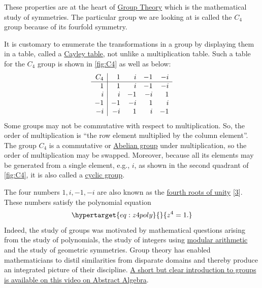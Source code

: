 \documentclass[
  a4paper,
]{article}
\begin{document}
These properties are at the heart of
\href{https://en.wikipedia.org/wiki/Group_(mathematics)}{Group Theory}
which is the mathematical study of symmetries. The particular group we
are looking at is called the \(C_4\) group because of its fourfold
symmetry.

It is customary to enumerate the transformations in a group by
displaying them in a table, called a
\href{https://en.wikipedia.org/wiki/Cayley_table}{Cayley table}, not
unlike a multiplication table. Such a table for the \(C_4\) group is
shown in \cref{fig:C4} as well as below: \[
\begin{array}{r | r  r  r  r}
C_{4} & 1  & i & -1 & -i\\
\hline
1 & 1 & i & -1 & -i\\
i & i & -1 & -i  & 1\\
-1 & -1 & -i & 1 & i\\
-i & -i & 1  & i & -1\\
\end{array}
\] Some groups may not be commutative with respect to multiplication.
So, the order of multiplication is ``the row element multiplied by the
column element''. The group \(C_4\) is a commutative or
\href{https://en.wikipedia.org/wiki/Abelian_group}{Abelian group} under
multiplication, so the order of multiplication may be swapped. Moreover,
because all its elements may be generated from a single element, e.g.,
\(i\), as shown in the second quadrant of \cref{fig:C4}, it is also
called a \href{https://en.wikipedia.org/wiki/Cyclic_group}{cyclic
group}.

The four numbers \(1, i, -1, -i\) are also known as the
\href{https://mathworld.wolfram.com/RootofUnity.html}{fourth roots of
unity} {[}\protect\hyperlink{ref-honner2021}{3}{]}. These numbers
satisfy the polynomial equation
\begin{equation}\protect\hypertarget{eq:z4poly}{}{
z^4 = 1.
}\label{eq:z4poly}\end{equation} Indeed, the study of groups was
motivated by mathematical questions arising from the study of
polynomials, the study of integers using
\href{https://en.wikipedia.org/wiki/Modular_arithmetic}{modular
arithmetic} and the study of geometric symmetries. Group theory has
enabled mathematicians to distil similarities from disparate domains and
thereby produce an integrated picture of their discipline.
\href{https://www.youtube.com/watch?v=IP7nW_hKB7I}{A short but clear
introduction to groups is available on this video on Abstract Algebra}.
\end{document}
